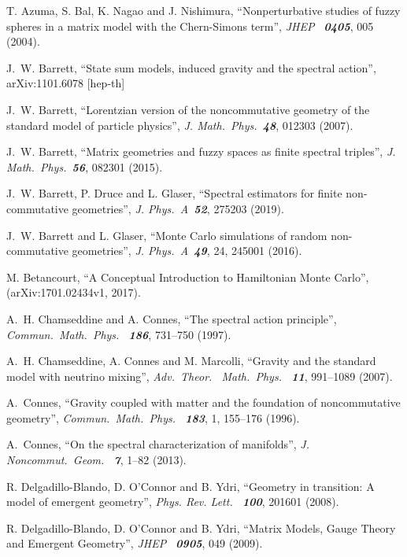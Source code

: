 \documentclass[12pt,a4paper]{article}
\begin{document}
\begin{thebibliography}{99} %

T. Azuma, S. Bal, K. Nagao and J. Nishimura,
``Nonperturbative studies of fuzzy spheres in a matrix model with the Chern-Simons term'',
{\it JHEP \ \bf 0405}, 005 (2004).

J.~W. Barrett,
``State sum models, induced gravity and the spectral action'',
arXiv:1101.6078 [hep-th]

J.~W. Barrett,
``Lorentzian version of the noncommutative geometry of the standard model of particle physics'',
{\it J. Math.\ Phys.\ \bf 48}, 012303 (2007).

J.~W. Barrett,
``Matrix geometries and fuzzy spaces as finite spectral triples'',
{\it J. Math.\ Phys.\ \bf 56}, 082301 (2015).

J.~W. Barrett, P. Druce and L. Glaser,
``Spectral estimators for finite non-commutative geometries'',
{\it J. Phys.\ A\ \bf 52}, 275203 (2019).

J.~W. Barrett and L. Glaser,
``Monte Carlo simulations of random non-commutative geometries'',
{\it J. Phys.\ A\ \bf 49}, 24, 245001 (2016).

M. Betancourt,
``A Conceptual Introduction to Hamiltonian Monte Carlo'',
(arXiv:1701.02434v1, 2017).

A.~H. Chamseddine and A. Connes,
``The spectral action principle'',
{\it Commun.\ Math.\ Phys. \ \bf 186}, 731--750 (1997).

A.~H. Chamseddine, A. Connes and M. Marcolli,
``Gravity and the standard model with neutrino mixing'',
{\it Adv.\ Theor. \ Math.\ Phys. \ \bf 11}, 991--1089 (2007).

A.~Connes,
``Gravity coupled with matter and the foundation of noncommutative geometry'',
{\it Commun.\ Math.\ Phys. \ \bf 183}, 1, 155--176 (1996).

A.~Connes,
``On the spectral characterization of manifolds'',
{\it J. Noncommut.\ Geom. \ \bf 7}, 1--82 (2013).

R. Delgadillo-Blando, D. O’Connor and B. Ydri,
``Geometry in transition: A model of emergent geometry'',
{\it Phys. Rev. Lett. \ \bf 100}, 201601 (2008).
 
R. Delgadillo-Blando, D. O’Connor and B. Ydri,
``Matrix Models, Gauge Theory and Emergent Geometry'',
{\it JHEP \ \bf 0905}, 049 (2009).


\end{thebibliography}
\end{document}
